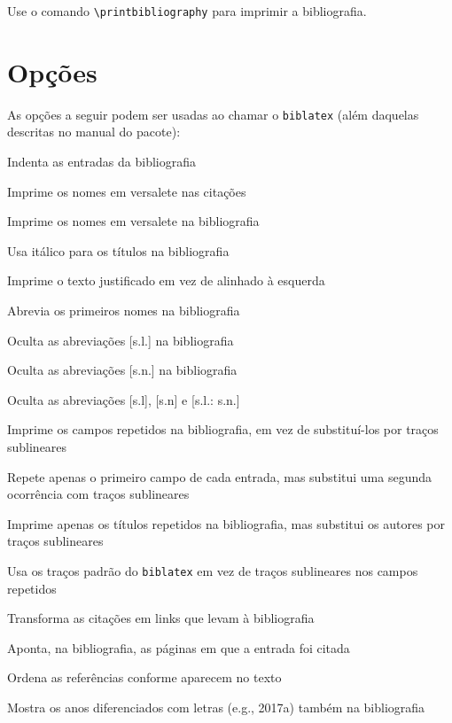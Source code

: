 \documentclass[a4paper]{article}
\begin{document}
Use o comando \verb"\printbibliography" para imprimir a bibliografia.

\clearpage
\section{Opções}%
\label{sec:opções}

As opções a seguir podem ser usadas ao chamar o \texttt{biblatex} (além daquelas descritas no manual do pacote):

\begin{description}[itemindent=-1em,leftmargin=3em]%
  \item [indent] Indenta as entradas da bibliografia
  \item [sccite] Imprime os nomes em versalete nas citações
  \item [scbib] Imprime os nomes em versalete na bibliografia
  \item [ittitles] Usa itálico para os títulos na bibliografia
  \item [justify] Imprime o texto justificado em vez de alinhado à esquerda
  \item [giveninits] Abrevia os primeiros nomes na bibliografia
  \item [nosl] Oculta as abreviações [s.l.] na bibliografia
  \item [nosn] Oculta as abreviações [s.n.] na bibliografia
  \item [noslsn] Oculta as abreviações [s.l], [s.n] e [s.l.: s.n.]
  \item [repeatfields] Imprime os campos repetidos na bibliografia, em vez de
    substituí-los por traços sublineares
  \item [repeatfirstfields] Repete apenas o primeiro campo de cada entrada,
    mas substitui uma segunda ocorrência com traços sublineares
  \item [repeattitles] Imprime apenas os títulos repetidos na bibliografia,
    mas substitui os autores por traços sublineares
  \item [usedashes] Usa os traços padrão do \texttt{biblatex} em vez de
    traços sublineares nos campos repetidos
  \item [hyperref] Transforma as citações em links que levam à bibliografia
  \item [backref] Aponta, na bibliografia, as páginas em que a entrada foi
    citada
  \item [sorting=none] Ordena as referências conforme aparecem no texto
  \item [extrayear] Mostra os anos diferenciados com letras (e.g., 2017a) também na bibliografia
\end{description}%
\end{document}
